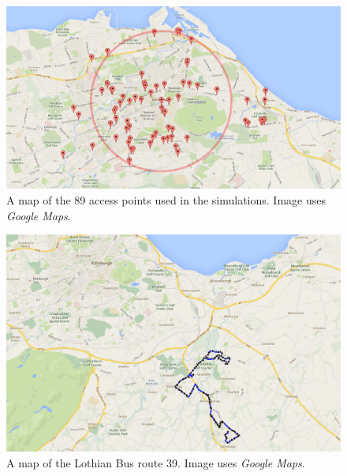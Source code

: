 \documentclass[12pt,a4paper,notitlepage]{article}
\begin{document}
\begin{figure}[H]
    \begin{center}
        \includegraphics[width=\textwidth]{../images/APMap.png}
        \caption{A map of the 89 access points used in the simulations. Image uses \emph{Google Maps}.}
        \label{fig:apmap}
    \end{center}
\end{figure}

\begin{figure}[H]
    \begin{center}
        \includegraphics[width=\textwidth]{../images/Route39.png}
        \caption{A map of the Lothian Bus route 39. Image uses \emph{Google Maps}.}
        \label{fig:route39}
    \end{center}
\end{figure}
\end{document}
